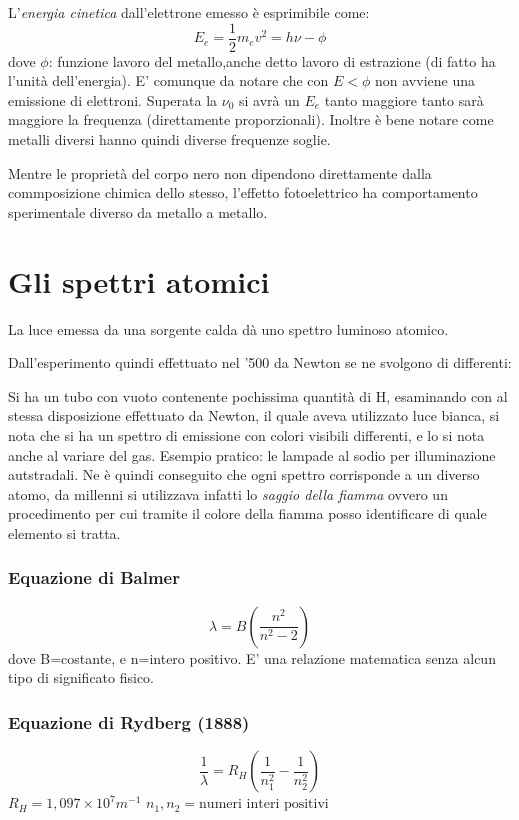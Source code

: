 L'\emph{energia cinetica} dall'elettrone emesso è esprimibile come: \[E_e=\frac{1}{2}m_ev^{2}=h\nu-\phi\] dove $\phi$: funzione lavoro del metallo,anche detto lavoro di estrazione (di fatto ha l'unità dell'energia). E' comunque da notare che con $E<\phi$ non avviene una emissione di elettroni. Superata la $\nu_0$ si avrà un $E_e$ tanto maggiore tanto sarà maggiore la frequenza (direttamente proporzionali). Inoltre è bene notare come metalli diversi hanno quindi diverse frequenze soglie. 

Mentre le proprietà del corpo nero non dipendono direttamente dalla commposizione chimica dello stesso, l'effetto fotoelettrico ha comportamento sperimentale diverso da metallo a metallo. 

\section{Gli spettri atomici}
La luce emessa da una sorgente calda dà uno spettro luminoso atomico. 


Dall'esperimento quindi effettuato nel '500 da Newton se ne svolgono di differenti: %

Si ha un tubo con vuoto contenente pochissima quantità di H, esaminando con al stessa disposizione effettuato da Newton, il quale aveva utilizzato luce bianca, si nota che si ha un spettro di emissione con colori visibili differenti, e lo si nota anche al variare del gas. 
Esempio pratico: le lampade al sodio per illuminazione autstradali. 
Ne è quindi conseguito che ogni spettro corrisponde a un diverso atomo, da millenni si utilizzava infatti lo \emph{saggio della fiamma} ovvero un procedimento per cui tramite il colore della fiamma posso identificare di quale elemento si tratta. 

\subsubsection{Equazione di Balmer}
\[\lambda=B(\frac{n^{2}}{n^{2}-2})\] dove B=costante, e n=intero positivo. 
E' una relazione matematica senza alcun tipo di significato fisico. 

\subsubsection{Equazione di Rydberg (1888)}
\[\frac{1}{\lambda}=R_H(\frac{1}{n_1^{2}}-\frac{1}{n_2^{2}})\]
$R_H=1,097\times10^{7} m^{-1}$  $n_1,n_2=\text{numeri interi positivi}$

